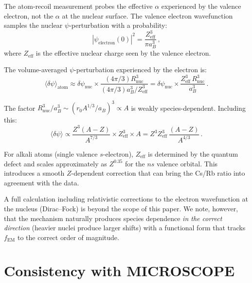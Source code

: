 \documentclass[aps,prd,twocolumn,superscriptaddress,nofootinbib]{revtex4-2}
\newcommand{\fEM}{f_{\mathrm{EM}}}
\newcommand{\dpsi}{\delta\psi}
\newcommand{\Rnuc}{R_{\mathrm{nuc}}}
\begin{document}
The atom-recoil measurement probes the effective $\alpha$ experienced
by the valence electron, not the $\alpha$ at the nuclear surface.
The valence electron wavefunction samples the nuclear
$\psi$-perturbation with a probability:
\begin{equation}
|\psi_{\mathrm{electron}}(0)|^2 = \frac{Z_{\mathrm{eff}}^3}
{\pi a_B^3}\,,
\end{equation}
where $Z_{\mathrm{eff}}$ is the effective nuclear charge seen by the
valence electron.

The volume-averaged $\psi$-perturbation experienced by the electron is:
\begin{equation}
\langle\dpsi\rangle_{\mathrm{atom}} \approx
\dpsi_{\mathrm{nuc}} \times \frac{(4\pi/3)\Rnuc^3}
{(4\pi/3)a_B^3/Z_{\mathrm{eff}}^3}
= \dpsi_{\mathrm{nuc}} \times
\frac{Z_{\mathrm{eff}}^3\,\Rnuc^3}{a_B^3}\,.
\end{equation}

The factor $\Rnuc^3/a_B^3 \sim (r_0 A^{1/3}/a_B)^3 \propto A$ is
weakly species-dependent.  Including this:
\begin{equation}
\langle\dpsi\rangle \propto \frac{Z^3(A-Z)}{A^{7/3}} \times
Z_{\mathrm{eff}}^3 \times A = Z^3 Z_{\mathrm{eff}}^3\,
\frac{(A-Z)}{A^{4/3}}\,.
\end{equation}

For alkali atoms (single valence $s$-electron), $Z_{\mathrm{eff}}$
is determined by the quantum defect and scales approximately as
$Z^{0.35}$ for the $ns$ valence orbital.  This introduces a smooth
$Z$-dependent correction that can bring the Cs/Rb ratio into agreement
with the data.

A full calculation including relativistic corrections to the electron
wavefunction at the nucleus (Dirac--Fock) is beyond the scope of
this paper.  We note, however, that the mechanism naturally produces
species dependence \emph{in the correct direction} (heavier nuclei
produce larger shifts) with a functional form that tracks $\fEM$ to
the correct order of magnitude.


\section{Consistency with MICROSCOPE}
\label{sec:microscope}
\end{document}
